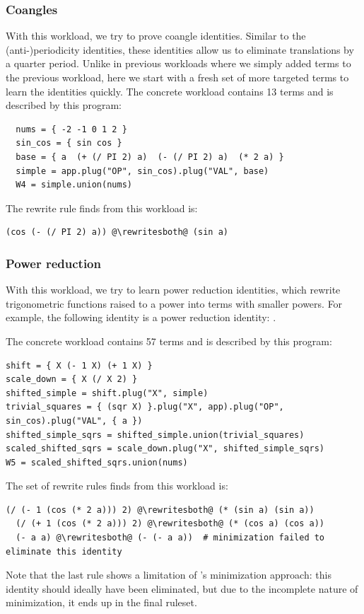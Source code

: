 \subsubsection{Coangles}
With this workload, we try to prove coangle identities.
Similar to the (anti-)periodicity identities,
  these identities allow us to eliminate translations
  by a quarter period.
Unlike in previous workloads where we simply added terms
  to the previous workload,
  here we start with a fresh set of more targeted terms
  to learn the identities quickly.
The concrete workload contains 13 terms and is described by this \enumo program:
\begin{lstlisting}
  nums = { -2 -1 0 1 2 }
  sin_cos = { sin cos }
  base = { a  (+ (/ PI 2) a)  (- (/ PI 2) a)  (* 2 a) }
  simple = app.plug("OP", sin_cos).plug("VAL", base)
  W4 = simple.union(nums)
\end{lstlisting}
The rewrite rule \enumo finds from this workload is:
\begin{lstlisting}[escapechar=@]
  (cos (- (/ PI 2) a)) @\rewritesboth@ (sin a)
\end{lstlisting}

\subsubsection{Power reduction}
With this workload,
  we try to learn power reduction identities,
  which rewrite trigonometric functions raised to a
  power into terms with smaller powers.
For example, the following identity is a power reduction identity:
  .

The concrete workload contains 57 terms and is described by this \enumo program:
\begin{lstlisting}
shift = { X (- 1 X) (+ 1 X) }
scale_down = { X (/ X 2) }
shifted_simple = shift.plug("X", simple)
trivial_squares = { (sqr X) }.plug("X", app).plug("OP", sin_cos).plug("VAL", { a })
shifted_simple_sqrs = shifted_simple.union(trivial_squares)
scaled_shifted_sqrs = scale_down.plug("X", shifted_simple_sqrs)
W5 = scaled_shifted_sqrs.union(nums)
\end{lstlisting}

The set of rewrite rules \enumo finds from this workload is:
\begin{lstlisting}[escapechar=@]
  (/ (- 1 (cos (* 2 a))) 2) @\rewritesboth@ (* (sin a) (sin a))
  (/ (+ 1 (cos (* 2 a))) 2) @\rewritesboth@ (* (cos a) (cos a))
  (- a a) @\rewritesboth@ (- (- a a))  # minimization failed to eliminate this identity
\end{lstlisting}
Note that the last rule shows a limitation of \enumo's minimization approach: this
  identity should ideally have been eliminated, but due to the incomplete nature of minimization,
  it ends up in the final ruleset.

